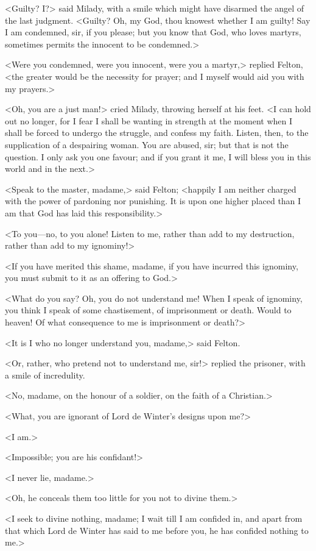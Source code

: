<Guilty? I?> said Milady, with a smile which might have disarmed the angel of the last judgment. <Guilty? Oh, my God, thou knowest whether I am guilty! Say I am condemned, sir, if you please; but you know that God, who loves martyrs, sometimes permits the innocent to be condemned.> 

<Were you condemned, were you innocent, were you a martyr,> replied Felton, <the greater would be the necessity for prayer; and I myself would aid you with my prayers.> 

<Oh, you are a just man!> cried Milady, throwing herself at his feet. <I can hold out no longer, for I fear I shall be wanting in strength at the moment when I shall be forced to undergo the struggle, and confess my faith. Listen, then, to the supplication of a despairing woman. You are abused, sir; but that is not the question. I only ask you one favour; and if you grant it me, I will bless you in this world and in the next.> 

<Speak to the master, madame,> said Felton; <happily I am neither charged with the power of pardoning nor punishing. It is upon one higher placed than I am that God has laid this responsibility.> 

<To you—no, to you alone! Listen to me, rather than add to my destruction, rather than add to my ignominy!> 

<If you have merited this shame, madame, if you have incurred this ignominy, you must submit to it as an offering to God.> 

<What do you say? Oh, you do not understand me! When I speak of ignominy, you think I speak of some chastisement, of imprisonment or death. Would to heaven! Of what consequence to me is imprisonment or death?> 

<It is I who no longer understand you, madame,> said Felton. 

<Or, rather, who pretend not to understand me, sir!> replied the prisoner, with a smile of incredulity. 

<No, madame, on the honour of a soldier, on the faith of a Christian.> 

<What, you are ignorant of Lord de Winter's designs upon me?> 

<I am.> 

<Impossible; you are his confidant!> 

<I never lie, madame.> 

<Oh, he conceals them too little for you not to divine them.> 

<I seek to divine nothing, madame; I wait till I am confided in, and apart from that which Lord de Winter has said to me before you, he has confided nothing to me.> 

